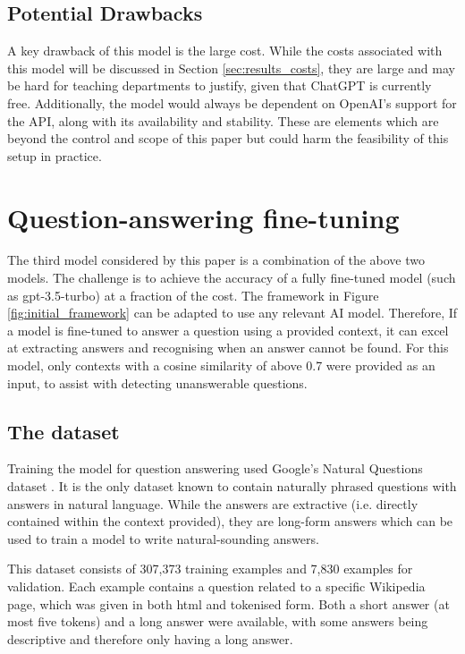 \subsection{Potential Drawbacks}
A key drawback of this model is the large cost. While the costs associated with this model will be discussed in Section \ref{sec:results_costs}, they are large and may be hard for teaching departments to justify, given that ChatGPT is currently free. Additionally, the model would always be dependent on OpenAI's support for the API, along with its availability and stability. These are elements which are beyond the control and scope of this paper but could harm the feasibility of this setup in practice.


\section{Question-answering fine-tuning}
The third model considered by this paper is a combination of the above two models. The challenge is to achieve the accuracy of a fully fine-tuned model (such as gpt-3.5-turbo) at a fraction of the cost. The framework in Figure \ref{fig:initial_framework} can be adapted to use any relevant AI model. Therefore, If a model is fine-tuned to answer a question using a provided context, it can excel at extracting answers and recognising when an answer cannot be found. For this model, only contexts with a cosine similarity of above 0.7 were provided as an input, to assist with detecting unanswerable questions.

\subsection{The dataset}
Training the model for question answering used Google's Natural Questions dataset \citep{NQdataset}. It is the only dataset known to contain naturally phrased questions with answers in natural language. While the answers are extractive (i.e. directly contained within the context provided), they are long-form answers which can be used to train a model to write natural-sounding answers.

This dataset consists of 307,373 training examples and 7,830 examples for validation. Each example contains a question related to a specific Wikipedia page, which was given in both \acrshort{html} and tokenised form. Both a short answer (at most five tokens) and a long answer were available, with some answers being descriptive and therefore only having a long answer.

